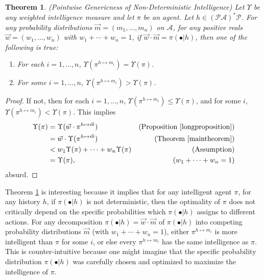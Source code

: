 \documentclass{article}
\newtheorem{theorem}{Theorem}
\begin{document}
\begin{theorem}
\label{pointwisegenericnessthm}
    (Pointwise Genericness of Non-Deterministic Intelligence)
    Let $\Upsilon$ be any weighted intelligence measure and let
    $\pi$ be an agent.
    Let $h\in (\mathcal P\mathcal A)^*\mathcal P$.
    For any probability distributions $\vec m=(m_1,\ldots,m_n)$ on $\mathcal A$,
    for any positive reals $\vec w=(w_1,\ldots,w_n)$ with $w_1+\cdots+w_n=1$,
    if $\vec w\cdot\vec m=\pi(\bullet|h)$,
    then one of the following is true:
    \begin{enumerate}
        \item For each $i=1,\ldots,n$, $\Upsilon(\pi^{h\mapsto m_i})=\Upsilon(\pi)$.
        \item For some $i=1,\ldots,n$, $\Upsilon(\pi^{h\mapsto m_i})>\Upsilon(\pi)$.
    \end{enumerate}
\end{theorem}

\begin{proof}
    If not, then for each $i=1,\ldots,n$, $\Upsilon(\pi^{h\mapsto m_i})\leq\Upsilon(\pi)$,
    and for some $i$, $\Upsilon(\pi^{h\mapsto m_i})<\Upsilon(\pi)$.
    This implies
    \begin{align*}
        \Upsilon(\pi)
            &= \Upsilon(\vec w\cdot\pi^{h\mapsto\vec m})
                &\mbox{(Proposition \ref{longproposition})}\\
            &= \vec w\cdot\Upsilon(\pi^{h\mapsto\vec m})
                &\mbox{(Theorem \ref{maintheorem})}\\
            &< w_1\Upsilon(\pi)+\cdots+w_n\Upsilon(\pi)
                &\mbox{(Assumption)}\\
            &= \Upsilon(\pi),
                &\mbox{($w_1+\cdots+w_n=1$)}
    \end{align*}
    absurd.
\end{proof}

Theorem \ref{pointwisegenericnessthm} is interesting because it implies that for
any intelligent agent $\pi$, for any history $h$, if $\pi(\bullet|h)$ is not deterministic,
then the optimality of $\pi$ does not critically depend on the specific probabilities
which $\pi(\bullet|h)$ assigns to different actions. For any decomposition
$\pi(\bullet|h)=\vec w\cdot\vec m$ of $\pi(\bullet|h)$ into competing probability
distributions $\vec m$
(with $w_1+\cdots+w_n=1$), either $\pi^{h\mapsto m_i}$ is more intelligent
than $\pi$ for some $i$, or else every $\pi^{h\mapsto m_i}$ has the same intelligence as
$\pi$. This is counter-intuitive because one might imagine that the specific probability
distribution $\pi(\bullet|h)$ was carefully chosen and optimized to maximize the intelligence
of $\pi$.
\end{document}
